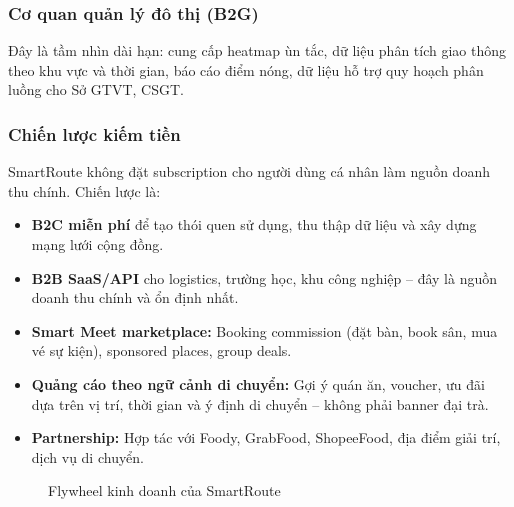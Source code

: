 \documentclass[12pt,a4paper]{article}
\begin{document}
\subsubsection{Cơ quan quản lý đô thị (B2G)}
Đây là tầm nhìn dài hạn: cung cấp heatmap ùn tắc, dữ liệu phân tích giao thông theo khu vực và thời gian, báo cáo điểm nóng, dữ liệu hỗ trợ quy hoạch phân luồng cho Sở GTVT, CSGT.

\subsubsection{Chiến lược kiếm tiền}
SmartRoute không đặt subscription cho người dùng cá nhân làm nguồn doanh thu chính. Chiến lược là:
\begin{itemize}[leftmargin=1.2cm]
    \item \textbf{B2C miễn phí} để tạo thói quen sử dụng, thu thập dữ liệu và xây dựng mạng lưới cộng đồng.
    \item \textbf{B2B SaaS/API} cho logistics, trường học, khu công nghiệp -- đây là nguồn doanh thu chính và ổn định nhất.
    \item \textbf{Smart Meet marketplace:} Booking commission (đặt bàn, book sân, mua vé sự kiện), sponsored places, group deals.
    \item \textbf{Quảng cáo theo ngữ cảnh di chuyển:} Gợi ý quán ăn, voucher, ưu đãi dựa trên vị trí, thời gian và ý định di chuyển -- không phải banner đại trà.
    \item \textbf{Partnership:} Hợp tác với Foody, GrabFood, ShopeeFood, địa điểm giải trí, dịch vụ di chuyển.
\end{itemize}

\begin{figure}[H]
\centering
{}
\caption{Flywheel kinh doanh của SmartRoute}
\label{fig:business-flywheel}
\end{figure}
\end{document}

